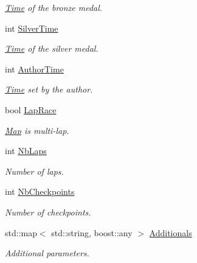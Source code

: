 \begin{DoxyCompactItemize}
\begin{DoxyCompactList}\small\item\em \hyperlink{classTime}{Time} of the bronze medal. \end{DoxyCompactList}\item 
\hypertarget{structMap_ad3121edccf9be02843ca91622a88a1a5}{int \hyperlink{structMap_ad3121edccf9be02843ca91622a88a1a5}{Silver\-Time}}\label{structMap_ad3121edccf9be02843ca91622a88a1a5}

\begin{DoxyCompactList}\small\item\em \hyperlink{classTime}{Time} of the silver medal. \end{DoxyCompactList}\item 
\hypertarget{structMap_a342a757d471cf664f069c537c7f0ad1a}{int \hyperlink{structMap_a342a757d471cf664f069c537c7f0ad1a}{Author\-Time}}\label{structMap_a342a757d471cf664f069c537c7f0ad1a}

\begin{DoxyCompactList}\small\item\em \hyperlink{classTime}{Time} set by the author. \end{DoxyCompactList}\item 
\hypertarget{structMap_a0b88590574688965bf8b7442f3792000}{bool \hyperlink{structMap_a0b88590574688965bf8b7442f3792000}{Lap\-Race}}\label{structMap_a0b88590574688965bf8b7442f3792000}

\begin{DoxyCompactList}\small\item\em \hyperlink{structMap}{Map} is multi-\/lap. \end{DoxyCompactList}\item 
\hypertarget{structMap_a2a06493a298b5ebfae70ecbfb0bca406}{int \hyperlink{structMap_a2a06493a298b5ebfae70ecbfb0bca406}{Nb\-Laps}}\label{structMap_a2a06493a298b5ebfae70ecbfb0bca406}

\begin{DoxyCompactList}\small\item\em Number of laps. \end{DoxyCompactList}\item 
\hypertarget{structMap_abadd4d6809c065522960a0db897d6c10}{int \hyperlink{structMap_abadd4d6809c065522960a0db897d6c10}{Nb\-Checkpoints}}\label{structMap_abadd4d6809c065522960a0db897d6c10}

\begin{DoxyCompactList}\small\item\em Number of checkpoints. \end{DoxyCompactList}\item 
\hypertarget{structMap_a82524d649b33d280a49773629345b0bc}{std\-::map$<$ std\-::string, boost\-::any $>$ \hyperlink{structMap_a82524d649b33d280a49773629345b0bc}{Additionals}}\label{structMap_a82524d649b33d280a49773629345b0bc}

\begin{DoxyCompactList}\small\item\em Additional parameters. \end{DoxyCompactList}\end{DoxyCompactItemize}
